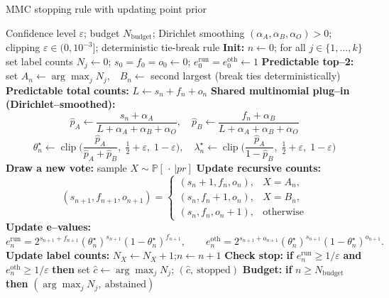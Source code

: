 \begin{algorithm}[!ht]
{\small
\caption{MMC stopping rule with  updating point prior}
\label{alg:mmc_shared_point}
\begin{algorithmic}[1]
\Require Confidence level $\varepsilon$; budget $N_{\text{budget}}$; Dirichlet smoothing $(\alpha_A,\alpha_B,\alpha_O)>0$; clipping $\varepsilon\in(0,10^{-3}]$; deterministic tie-break rule
\State \textbf{Init:} $n\leftarrow 0$; for all $j\in\{1,\dots,k\}$ set label counts  $N_j\leftarrow 0$; $s_0=f_0=o_0\leftarrow 0$; $e^{\mathrm{run}}_0=e^{\mathrm{oth}}_0\leftarrow 1$
\State \textbf{Predictable top–2:} set $A_n \leftarrow \arg\max_j N_j$,\ \ $B_n \leftarrow$ second largest (break ties deterministically)
\State \textbf{Predictable total counts:} $L\gets s_n +  f_n +  o_n$
\State \textbf{Shared multinomial plug–in (Dirichlet–smoothed):}
$$\displaystyle \hat p_{A}\leftarrow \frac{ s_n+\alpha_A}{L+\alpha_A+\alpha_B+\alpha_O},\quad
         \hat p_{B}\leftarrow \frac{ f_n+\alpha_B}{L+\alpha_A+\alpha_B+\alpha_O}$$
$$\displaystyle \theta^\star_{n}\leftarrow \operatorname{clip}\!\Big(\frac{\hat p_{A}}{\hat p_{A}+\hat p_{B}},\;\tfrac12+\varepsilon,\;1-\varepsilon\Big),\quad
         \lambda^\star_{n}\leftarrow \operatorname{clip}\!\Big(\frac{\hat p_{A}}{1-\hat p_{B}},\;\tfrac12+\varepsilon,\;1-\varepsilon\Big)$$
\State \textbf{Draw a new vote:} sample $X\sim \mathbb P[\,\cdot\,| pr]$
\State \textbf{Update recursive counts:}
\[
(s_{n+1},f_{n+1},o_{n+1}) \!=\!
\begin{cases}
(s_n\!+\!1, f_n, o_n), & X=A_n,\\
(s_n, f_n\!+\!1, o_n), & X=B_n,\\
(s_n, f_n, o_n\!+\!1), & \text{otherwise}
\end{cases}
\]
\State \textbf{Update e–values:} $$e^{\mathrm{run}}_n
= 2^{s_{n+1}+f_{n+1}}(\theta_n^\star)^{s_{n+1}}(1-\theta_n^\star)^{f_{n+1}},\qquad
{e^{\mathrm{oth}}_n
= 2^{s_{n+1}+o_{n+1}}(\theta_n^\star)^{s_{n+1}}(1-\theta_n^\star)^{o_{n+1}}}.$$
\State \textbf{Update label counts:} $N_X\leftarrow N_X+1$;\quad $n\leftarrow n+1$
\State \textbf{Check stop:} \textbf{if} $e^{\mathrm{run}}_n\ge 1/\varepsilon$ \textbf{and} $e^{\mathrm{oth}}_n\ge 1/\varepsilon$ \textbf{then}
\State \hspace{1.2em} set $\hat c \leftarrow \arg\max_j N_j$;\; \Return $(\hat c,\ \text{stopped})$
\State \textbf{Budget:} \textbf{if} $n\ge N_{\text{budget}}$ \textbf{then} \Return $(\arg\max_j N_j,\ \text{abstained})$
\EndWhile
\end{algorithmic}}
\normalsize
\end{algorithm}

